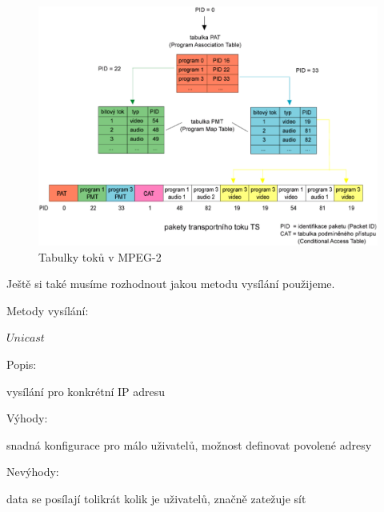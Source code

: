 \vspace{10pt}

\begin{figure}[ht]
\begin{center}
\includegraphics[width=15cm]{images/PATaPMT.eps}
\caption{Tabulky toků v MPEG-2}
\label{fig:PATaPMT}
\end{center}
\end{figure}

\vspace{10pt}

Ještě si také musíme rozhodnout jakou metodu vysílání použijeme.

\vspace{10pt}

Metody vysílání:

\vspace{10pt}

\begin{bf}$Unicast$\end{bf}


\begin{bf}Popis:\end{bf} vysílání pro konkrétní IP adresu


\begin{bf}Výhody:\end{bf} snadná konfigurace pro málo uživatelů, možnost definovat povolené adresy


\begin{bf}Nevýhody:\end{bf} data se posílají tolikrát kolik je uživatelů, značně zatežuje sít

\vspace{10pt}

